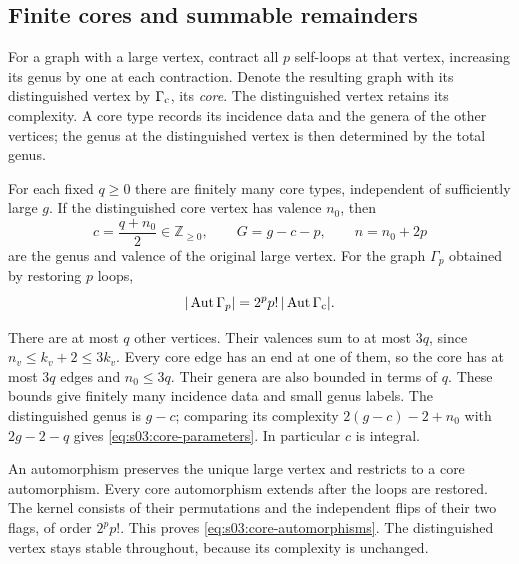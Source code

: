 \subsection{Finite cores and summable remainders}
\label{subsec:s03:04}

For a graph with a large vertex, contract all $p$ self-loops at that
vertex, increasing its genus by one at each contraction. Denote the
resulting graph with its distinguished vertex by $\Gamma_{\rm c}$,
its \emph{core}.
The distinguished vertex retains its complexity. A core type records
its incidence data and the genera of the other vertices; the genus
at the distinguished vertex is then determined by the total genus.

\begin{lmm}
\label{lmm:s03:finite-cores}
For each fixed $q\geq0$ there are finitely many core types,
independent of sufficiently large $g$. If the distinguished core
vertex has valence $n_0$, then
\begin{equation}
\label{eq:s03:core-parameters}
c=\frac{q+n_0}{2}\in\mathbb Z_{\geq0},\qquad
G=g-c-p,\qquad n=n_0+2p
\end{equation}
are the genus and valence of the original large vertex.
For the graph $\Gamma_p$ obtained by restoring $p$ loops,
\begin{equation}
\label{eq:s03:core-automorphisms}
|\operatorname{Aut}\Gamma_p|
=2^pp!\,|\operatorname{Aut}\Gamma_{\rm c}|.
\end{equation}
\end{lmm}
\begin{prf}
There are at most $q$ other vertices. Their valences sum to at most
$3q$, since $n_v\leq k_v+2\leq3k_v$.
Every core edge has an end at one of them, so the core has at most
$3q$ edges and $n_0\leq3q$. Their genera are also bounded in terms
of $q$. These bounds give finitely many incidence data and small
genus labels. The distinguished genus is $g-c$; comparing its
complexity $2(g-c)-2+n_0$ with $2g-2-q$ gives
\eqref{eq:s03:core-parameters}. In particular $c$ is integral.

An automorphism preserves the unique large vertex and restricts to
a core automorphism. Every core automorphism extends after the loops
are restored. The kernel consists of their permutations and the
independent flips of their two flags, of order $2^pp!$.
This proves \eqref{eq:s03:core-automorphisms}. The distinguished
vertex stays stable throughout, because its complexity is unchanged.
\end{prf}

